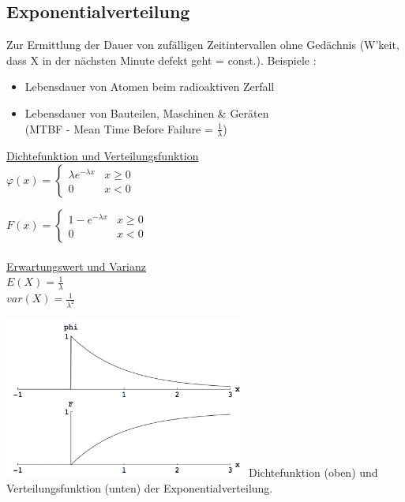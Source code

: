 	\subsection{Exponentialverteilung }
 		\begin{minipage}{10cm}
		Zur Ermittlung der Dauer von zufälligen Zeitintervallen ohne Gedächnis
		(W'keit, dass X in der nächsten Minute defekt geht = const.). Beispiele :
		\begin{itemize}
          \item Lebensdauer von Atomen beim radioaktiven Zerfall
          \item Lebensdauer von Bauteilen, Maschinen \& Geräten\\(MTBF -
          Mean Time Before Failure = $\frac{1}{\lambda}$)
        \end{itemize}
        
		\underline{Dichtefunktion und Verteilungsfunktion}\\
        $\varphi(x)=\begin{cases}
		\lambda e^{-\lambda x}  & x \geq 0\\
  		0						& x < 0
		\end{cases}$
		
		$F(x)=\begin{cases}
  		1-e^{-\lambda x}  		& x \geq 0\\
  		0	 					& x < 0
		\end{cases}$\\ \\

		\underline{Erwartungswert und Varianz}\\
		$E(X)=\frac{1}{\lambda}$\\
		$var(X)=\frac{1}{\lambda^2}$ \\
        \end{minipage}
		\begin{minipage}{8cm}
        \includegraphics[width=8cm]{./bilder/exponentialverteilung.png}
		Dichtefunktion (oben) und Verteilungsfunktion (unten) der Exponentialverteilung.
        \end{minipage}
		

